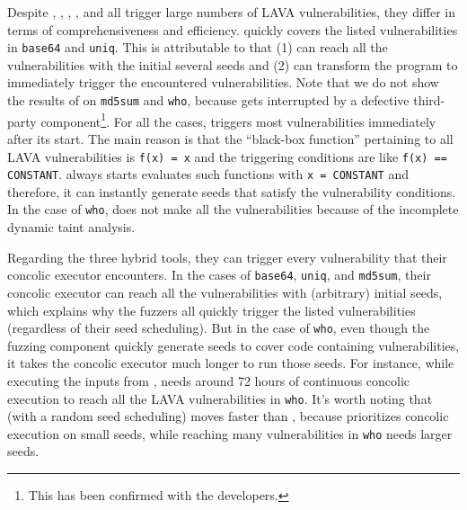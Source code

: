 Despite \tfuzz, \angora, \driller, \qsym, and \savior all trigger large numbers of LAVA vulnerabilities, 
they differ in terms of comprehensiveness and efficiency. \tfuzz quickly covers 
the listed vulnerabilities in {\tt base64} and {\tt uniq}. This is attributable to 
that (1) \tfuzz can reach all the vulnerabilities with the initial several seeds and (2) \tfuzz 
can transform the program to immediately trigger the encountered vulnerabilities.
Note that we do not show the results of \tfuzz on {\tt md5sum} and {\tt who},
because \tfuzz gets interrupted by a defective third-party component\footnote{This has been confirmed with the 
developers.}. For all the cases, \angora triggers most vulnerabilities
immediately after its start. The main reason is that the ``black-box function'' 
pertaining to all LAVA vulnerabilities 
is {\tt f(x) = x} and the triggering conditions are like {\tt f(x) == CONSTANT}. 
\angora always starts evaluates such functions with {\tt x = CONSTANT} and therefore, 
it can instantly generate seeds that satisfy the vulnerability conditions. 
In the case of {\tt who}, \angora does not make all the vulnerabilities 
because of the incomplete dynamic taint analysis. 

Regarding the three hybrid tools, they can trigger every vulnerability 
that their concolic executor encounters. In the cases of {\tt base64}, {\tt uniq}, and {\tt md5sum}, 
their concolic executor can reach all the vulnerabilities with (arbitrary) initial seeds,
which explains why the fuzzers all quickly trigger the listed vulnerabilities (regardless of their seed scheduling). 
But in the case of {\tt who}, even though the fuzzing component quickly generate
seeds to cover code containing vulnerabilities, 
it takes the concolic executor much longer to run those seeds.
For instance, while executing the inputs from \afl, \qsym needs 
around 72 hours of continuous concolic execution to reach 
all the LAVA vulnerabilities in {\tt who}. It's worth noting that \driller (with a random seed scheduling) 
moves faster than \qsym, because \qsym prioritizes concolic execution 
on small seeds, while reaching many vulnerabilities in {\tt who} needs larger seeds.

